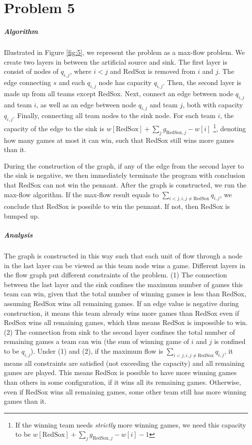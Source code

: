 \documentclass[12pt]{article}
\begin{document}
\section*{Problem 5}
\subparagraph{Algorithm}
Illustrated in Figure \ref{fig:5}, we represent the problem as a max-flow problem. We create two layers in between the artificial source and sink. The first layer is consist of nodes of $q_{i,j}$, where $i<j$ and RedSox is removed from $i$ and $j$. The edge connecting $s$ and each $q_{i,j}$ node has capacity $q_{i,j}$. Then, the second layer is made up from all teams except RedSox. Next, connect an edge between node $q_{i,j}$ and team $i$, as well as an edge between node $q_{i,j}$ and team $j$, both with capacity $q_{i,j}$. Finally, connecting all team nodes to the sink node. For each team $i$, the capacity of the edge to the sink is $w[\text{RedSox}] + \sum_j g_{\text{RedSox}, j} - w[i]$ \footnote{If the winning team needs \emph{strictly} more winning games, we need this capacity to be $w[\text{RedSox}] + \sum_j g_{\text{RedSox}, j} - w[i] - 1$}, denoting how many games at most it can win, such that RedSox still wins more games than it. 

During the construction of the graph, if any of the edge from the second layer to the sink is negative, we then immediately terminate the program with conclusion that RedSox can not win the pennant. After the graph is constructed, we run the max-flow algorithm. If the max-flow result equals to $\sum_{i<j, i, j \neq \text{RedSox}} q_{i,j}$, we conclude that RedSox is possible to win the pennant. If not, then RedSox is bumped up.

\subparagraph{Analysis} The graph is constructed in this way such that each unit of flow through a node in the last layer can be viewed as this team node wins a game. Different layers in the flow graph put different constraints of the problem. (1) The connection between the last layer and the sink confines the maximum number of games this team can win, given that the total number of winning games is less than RedSox, assuming RedSox wins all remaining games. If an edge value is negative during construction, it means this team already wins more games than RedSox even if RedSox wins all remaining games, which thus means RedSox is impossible to win. (2) The connection from sink to the second layer confines the total number of remaining games a team can win (the sum of winning game of $i$ and $j$ is confined to be $q_{i,j}$). Under (1) and (2), if the maximum flow is $\sum_{i<j, i, j \neq \text{RedSox}} q_{i,j}$, it means all constraints are satisfied (not exceeding the capacity) and all remaining games are played. This means RedSox is possible to have more winning games than others in some configuration, if it wins all its remaining games. Otherwise, even if RedSox wins all remaining games, some other team still has more winning games than it.
\end{document}
